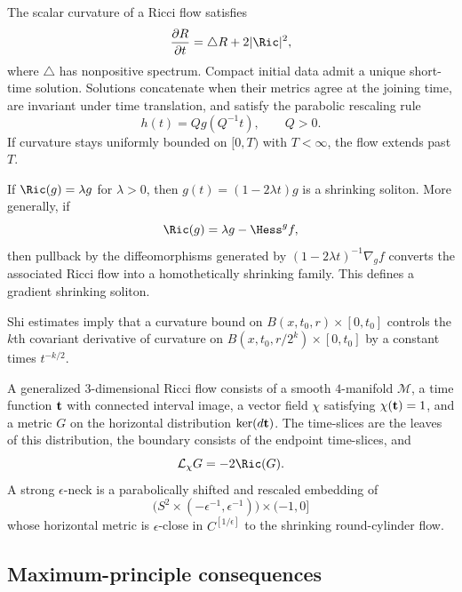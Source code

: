 The scalar curvature of a Ricci flow satisfies
\begin{equation}
\label{scalarflow}
  \frac{\partial R}{\partial t}=\triangle R+2|\Ric|^2,
\end{equation}
where $\triangle$ has nonpositive spectrum. Compact initial data admit a
unique short-time solution. Solutions concatenate when their metrics agree at
the joining time, are invariant under time translation, and satisfy the
parabolic rescaling rule
\[
  h(t)=Qg(Q^{-1}t),\qquad Q>0.
\]
If curvature stays uniformly bounded on $[0,T)$ with $T<\infty$, the flow
extends past $T$.

If $\Ric(g)=\lambda g$ for $\lambda>0$, then
$g(t)=(1-2\lambda t)g$ is a shrinking soliton. More generally, if
\[
  \Ric(g)=\lambda g-\Hess^g f,
\]
then pullback by the diffeomorphisms generated by
$(1-2\lambda t)^{-1}\nabla_g f$ converts the associated Ricci flow into a
homothetically shrinking family. This defines a gradient shrinking soliton.

Shi estimates imply that a curvature bound on
$B(x,t_0,r)\times[0,t_0]$ controls the $k$th covariant derivative of
curvature on $B(x,t_0,r/2^k)\times[0,t_0]$ by a constant times
$t^{-k/2}$.

A generalized $3$-dimensional Ricci flow consists of a smooth $4$-manifold
${\mathcal M}$, a time function ${\bf t}$ with connected interval image, a
vector field $\chi$ satisfying $\chi({\bf t})=1$, and a metric $G$ on the
horizontal distribution $\ker(d{\bf t})$. The time-slices are the leaves of
this distribution, the boundary consists of the endpoint time-slices, and
\[
  {\mathcal L}_\chi G=-2\Ric(G).
\]
A strong $\epsilon$-neck is a parabolically shifted and rescaled embedding of
\[
  \bigl(S^2\times(-\epsilon^{-1},\epsilon^{-1})\bigr)\times(-1,0]
\]
whose horizontal metric is $\epsilon$-close in $C^{[1/\epsilon]}$ to the
shrinking round-cylinder flow.

\subsection{Maximum-principle consequences}
\label{sectmax}

